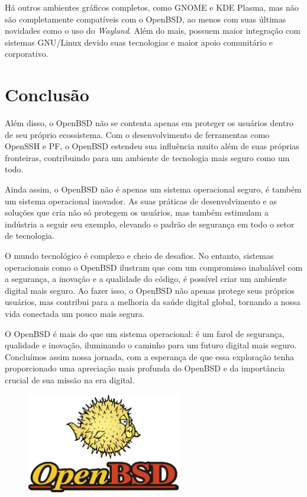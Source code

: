 \documentclass[a4paper,10pt]{article}
\begin{document}
Há outros ambientes gráficos completos, como GNOME e KDE Plasma, mas não são completamente compatíveis com o OpenBSD, ao menos com suas últimas novidades como o uso do \textit{Wayland}. Além do mais, possuem maior integração com sistemas GNU/Linux devido suas tecnologias e maior apoio comunitário e corporativo.

\section{Conclusão}

Além disso, o OpenBSD não se contenta apenas em proteger os usuários dentro de seu próprio ecossistema. Com o desenvolvimento de ferramentas como OpenSSH e PF, o OpenBSD estendeu sua influência muito além de suas próprias fronteiras, contribuindo para um ambiente de tecnologia mais seguro como um todo.

Ainda assim, o OpenBSD não é apenas um sistema operacional seguro, é também um sistema operacional inovador. As suas práticas de desenvolvimento e as soluções que cria não só protegem os usuários, mas também estimulam a indústria a seguir seu exemplo, elevando o padrão de segurança em todo o setor de tecnologia.

O mundo tecnológico é complexo e cheio de desafios. No entanto, sistemas operacionais como o OpenBSD ilustram que com um compromisso inabalável com a segurança, a inovação e a qualidade do código, é possível criar um ambiente digital mais seguro. Ao fazer isso, o OpenBSD não apenas protege seus próprios usuários, mas contribui para a melhoria da saúde digital global, tornando a nossa vida conectada um pouco mais segura.

O OpenBSD é mais do que um sistema operacional: é um farol de segurança, qualidade e inovação, iluminando o caminho para um futuro digital mais seguro. Concluímos assim nossa jornada, com a esperança de que essa exploração tenha proporcionado uma apreciação mais profunda do OpenBSD e da importância crucial de sua missão na era digital.

\begin{figure}[!ht]
    \centering
    \includegraphics[width=0.6\textwidth]{imagens/openbsd-logo.png}
\end{figure}

\printbibliography
\end{document}
